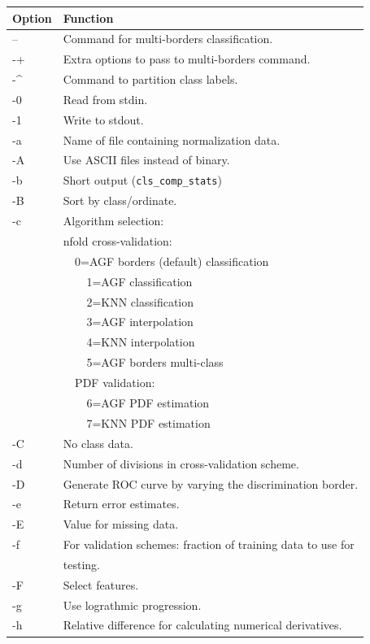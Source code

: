 \documentclass[12pt]{article}
\begin{document}
\begin{tabular}{ll}
Option & Function \\
\hline
-- & Command for multi-borders classification.\\
-+ & Extra options to pass to multi-borders command.\\
-\^ & Command to partition class labels.\\
-0 & Read from stdin.\\
-1 & Write to stdout.\\
-a & Name of file containing normalization data.\\
-A & Use ASCII files instead of binary.\\
-b & Short output (\verb/cls_comp_stats/)\\
-B & Sort by class/ordinate.\\
-c & Algorithm selection:\\
& nfold cross-validation:\\
& \verb/  /0=AGF borders (default) classification\\
& \verb/    /1=AGF classification\\
& \verb/    /2=KNN classification\\
& \verb/    /3=AGF interpolation\\
& \verb/    /4=KNN interpolation\\
& \verb/    /5=AGF borders multi-class\\
& \verb/  /PDF validation:\\
& \verb/    /6=AGF PDF estimation\\
& \verb/    /7=KNN PDF estimation\\
-C & No class data.\\
-d & Number of divisions in cross-validation scheme.\\
-D & Generate ROC curve by varying the discrimination border.\\
-e & Return error estimates.\\
-E & Value for missing data.\\
-f & For validation schemes:  fraction of training data to use for \\
   & testing.\\
-F & Select features.\\
-g & Use lograthmic progression. \\
-h & Relative difference for calculating numerical derivatives.
\end{tabular}
\end{document}
